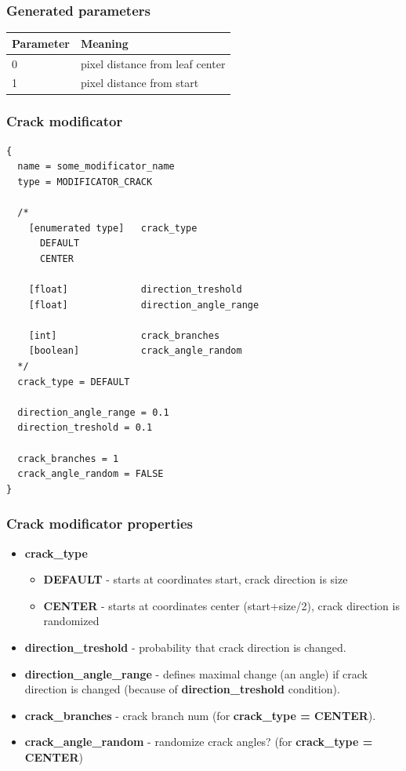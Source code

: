 \documentclass[9pt]{article}
\begin{document}
\subsubsection*{Generated parameters}

\begin{tabular}{|l||l|}
\hline
  Parameter & Meaning \\
\hline
\hline
  0 & pixel distance from leaf center \\
  1 & pixel distance from start \\  
\hline
\end{tabular}

\subsubsection{Crack modificator}

\begin{verbatim}
{
  name = some_modificator_name
  type = MODIFICATOR_CRACK

  /*
    [enumerated type]   crack_type    
      DEFAULT
      CENTER
      
    [float]             direction_treshold
    [float]             direction_angle_range
    
    [int]               crack_branches
    [boolean]           crack_angle_random
  */
  crack_type = DEFAULT
  
  direction_angle_range = 0.1
  direction_treshold = 0.1
  
  crack_branches = 1
  crack_angle_random = FALSE
}
\end{verbatim}
\subsubsection*{Crack modificator properties}
\begin{itemize}
\item{\bf crack\_type}
\begin{itemize}
\item{\bf DEFAULT} - starts at coordinates start, crack direction is size
\item{\bf CENTER} - starts at coordinates center (start+size/2), 
crack direction is randomized
\end{itemize}
\item{\bf direction\_treshold} - probability that crack direction is changed.
\item{\bf direction\_angle\_range} - defines maximal change (an angle)
if crack direction is changed (because of {\bf direction\_treshold} condition).
\item{\bf crack\_branches} - crack branch num (for {\bf crack\_type = CENTER}).
\item{\bf crack\_angle\_random} - randomize crack angles? (for {\bf crack\_type = CENTER})
\end{itemize}
\end{document}
